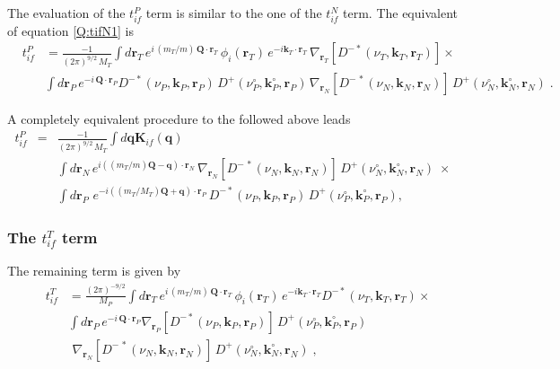 The evaluation of the $t^{P}_{if}$ term is similar to the one of the
$t^{N}_{if}$ term. The equivalent of equation \ref{Q:tifN1} is
\begin{eqnarray*}
&t^{P}_{if}&\!\!= \frac{-1}{(2 \pi)^{9/2}\, M_{T}}  \int d
\bm{r}_{T} \,
  e^{i \, (m_{T}/m) \, \bm{Q} \cdot \bm{r}_T}
\, \phi_{i}(\bm{r}_T) \, e^{-i \bm{k}_{T} \cdot \bm{r}_T}
\,\nabla_{\bm{r}_{T}}\left[ D^{-*}(\nu_{T},\bm{k}_{T},\bm{r}_T) \right]
{\times}
\\
&& \int d \bm{r}_{P} \,
   e^{- i \, \bm{Q} \cdot \bm{r}_{P}}
 D^{-*}(\nu_{P},\bm{k}_{P},\bm{r}_{P})
\, D^{+}(\nu_{P}^{\circ},\bm{k}_{P}^{\circ},\bm{r}_{P}) \,\nabla_{\bm{r}_{N}}\left[
D^{-\,\ast}(\nu_{N}, \bm{k}_{N}, \bm{r}_{N} )  \right]\,
D^{+}(\nu_{N}^{\circ},\bm{k}_{N}^{\circ},\bm{r}_{N})\; .\nonumber
\end{eqnarray*}

A completely equivalent procedure to the followed above leads
\begin{eqnarray}\label{Q:tifcdw2}
t^{P}_{if}&=& \frac{-1}{(2 \pi)^{9/2}\, M_{T}} \int d \bm{q}
\bm{K}_{if}(\bm{q}) \\
&& \int d \bm{r}_{N} \, e^{i \left( (m_{T}/m)\bm{Q} - \bm{q}
\right) \cdot \bm{r}_{N}} \, \nabla_{\bm{r}_{N}}\left[
D^{-\,\ast}(\nu_{N}, \bm{k}_{N}, \bm{r}_{N} ) \right]\,
D^{+}(\nu_{N}^{\circ},\bm{k}_{N}^{\circ},\bm{r}_{N})\; {\times}
  \\
&& \int d \bm{r}_{P} \, \,e^{ -i \left((m_{T}/M_{T})\bm{Q}+
\bm{q} \right) \cdot \bm{r}_{P}} \,
D^{-*}(\nu_{P},\bm{k}_{P},\bm{r}_{P} ) \, D^{+}(\nu_{P}^{\circ},\bm{k}_{P}^{\circ},
\bm{r}_{P}) ,\nonumber
\end{eqnarray}

\subsubsection{The $t^{T}_{if}$ term}
The remaining term is given by
%
\begin{eqnarray} \label{Q:tifT1}
&t^{T}_{if}&\!\!= \frac{(2 \pi)^{-9/2}}{M_{P}}  \int d \bm{r}_{T} \,
e^{i \, (m_{T}/m) \, \bm{Q} \cdot \bm{r}_T} \, \phi_{i}(\bm{r}_T)
\, e^{-i \bm{k}_{T} \cdot \bm{r}_T}
D^{-*}(\nu_{T},\bm{k}_{T},\bm{r}_T) {\times}
\\
&& \int d \bm{r}_{P} \, e^{- i \, \bm{Q} \cdot \bm{r}_{P}}
\nabla_{\bm{r}_{P}}\left[ D^{-*}(\nu_{P},\bm{k}_{P},\bm{r}_{P}) \right]
\,
D^{+}(\nu_{P}^{\circ},\bm{k}_{P}^{\circ},\bm{r}_{P}) \nonumber \\
&&\,\,\nabla_{\bm{r}_{N}}\left[ D^{-\,\ast}(\nu_{N}, \bm{k}_{N},
\bm{r}_{N} ) \right] \, D^{+}(\nu_{N}^{\circ},\bm{k}_{N}^{\circ},\bm{r}_{N})\;
,\nonumber
\end{eqnarray}

